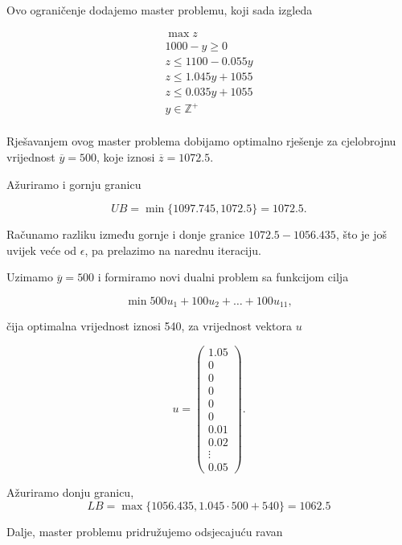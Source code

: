 \documentclass[a4paper, utf8, 11pt, colorlinks]{book}
\theoremstyle{definition}
\begin{document}
Ovo ograničenje dodajemo master problemu, koji sada izgleda


$$
\begin{aligned}
	\max z\\
	1000-y\geqslant 0\\
	z\leqslant 1100-0.055y\\ 
	z\leqslant 1.045y+1055\\
	z\leqslant 0.035y+1055\\
	y\in\mathbb{Z}^+\\	
\end{aligned}
$$

Rješavanjem ovog master problema dobijamo optimalno rješenje 
 za cjelobrojnu vrijednost $\overline{y}=500$, koje iznosi $\overline{z} = 1072.5$.
 
 Ažuriramo i gornju granicu

$$UB = \min\{1097.745, 1072.5\} =  1072.5.$$

Računamo razliku između gornje i donje granice $1072.5-1056.435$, što je još uvijek veće od $\epsilon$, pa prelazimo na narednu iteraciju.

Uzimamo 
$\overline{y}=500$ i formiramo novi dualni problem sa funkcijom cilja

$$\min 500u_1+ 100u_2+\ldots+100u_{11},$$

čija optimalna vrijednost iznosi 540, za vrijednost vektora $u$

$$u=\left(\begin{array}{c}
	1.05\\
	0\\
	0\\
	0\\
	0\\
	0\\
	0.01 \\
	0.02 \\
	\vdots \\
	0.05
\end{array}\right).$$

Ažuriramo donju granicu,
$$LB = \max\{1056.435, 1.045\cdot 500+540\} =1062.5 $$


Dalje, master problemu pridružujemo odsjecajuću ravan
 
\end{document}
